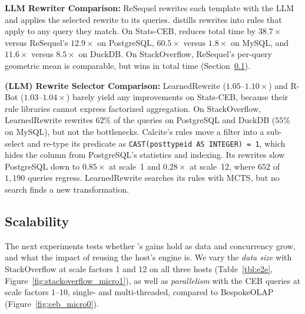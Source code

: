 \textbf{LLM Rewriter Comparison:} ReSequel rewrites each template with the LLM and applies the selected rewrite to its queries. {\sys} distills rewrites into rules that apply to any query they match.  On \textsf{Stats-CEB}, {\sys} reduces total time by $38.7\times$ versus ReSequel's $12.9\times$ on PostgreSQL, $60.5\times$ versus $1.8\times$ on MySQL, and $11.6\times$ versus $8.5\times$ on DuckDB. On \textsf{StackOverflow}, ReSequel's per-query geometric mean is comparable, but {\sys} wins in total time (Section~\ref{sec:exp:scalability}).

\textbf{(LLM) Rewrite Selector Comparison:} LearnedRewrite ($1.05$--$1.10\times$) and R-Bot ($1.03$--$1.04\times$) barely yield any improvements on \textsf{Stats-CEB}, because their rule libraries cannot express factorized aggregation. On \textsf{StackOverflow}, LearnedRewrite rewrites $62\%$ of the queries on PostgreSQL and DuckDB ($55\%$ on MySQL), but not the bottlenecks. Calcite's rules move a filter into a sub-select and re-type its predicate as \texttt{CAST(posttypeid AS INTEGER) = 1}, which hides the column from PostgreSQL's statistics and indexing. Its rewrites slow PostgreSQL down to $0.85\times$ at scale~1 and $0.28\times$ at scale~12, where $652$ of $1{,}190$ queries regress. LearnedRewrite searches its rules with MCTS, but no search finds a new transformation.

\subsection{Scalability}
\label{sec:exp:scalability}
The next experiments tests whether {\sys}'s gains hold as data and concurrency grow, and what the impact of reusing the host's engine is. We vary the \emph{data size} with \textsf{StackOverflow} at scale factors 1 and 12 on all three hosts (Table~\ref{tbl:e2e}, Figure~\ref{fig:stackoverflow_micro1}), as well as \emph{parallelism} with the \textsf{CEB} queries at scale factors 1--10, single- and multi-threaded, compared to BespokeOLAP (Figure~\ref{fig:ceb_micro0}).

